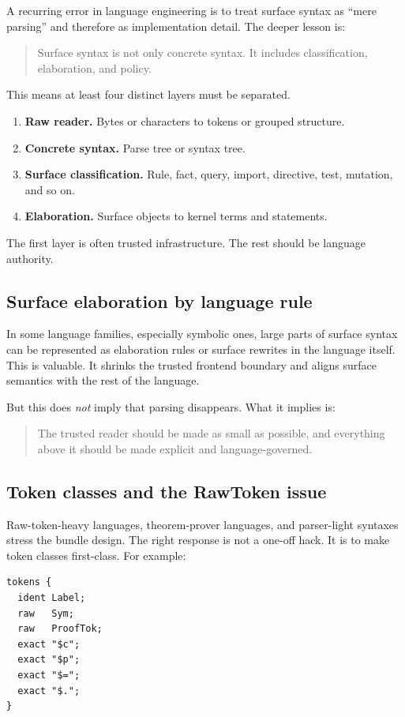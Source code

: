 \documentclass[11pt]{article}
\begin{document}
A recurring error in language engineering is to treat surface syntax as ``mere parsing'' and therefore as implementation detail. The deeper lesson is:
\begin{quote}
Surface syntax is not only concrete syntax. It includes classification, elaboration, and policy.
\end{quote}

This means at least four distinct layers must be separated.
\begin{enumerate}[leftmargin=2em]
  \item \textbf{Raw reader.} Bytes or characters to tokens or grouped structure.
  \item \textbf{Concrete syntax.} Parse tree or syntax tree.
  \item \textbf{Surface classification.} Rule, fact, query, import, directive, test, mutation, and so on.
  \item \textbf{Elaboration.} Surface objects to kernel terms and statements.
\end{enumerate}

The first layer is often trusted infrastructure. The rest should be language authority.

\subsection{Surface elaboration by language rule}

In some language families, especially symbolic ones, large parts of surface syntax can be represented as elaboration rules or surface rewrites in the language itself. This is valuable. It shrinks the trusted frontend boundary and aligns surface semantics with the rest of the language.

But this does \emph{not} imply that parsing disappears. What it implies is:
\begin{quote}
The trusted reader should be made as small as possible, and everything above it should be made explicit and language-governed.
\end{quote}

\subsection{Token classes and the RawToken issue}

Raw-token-heavy languages, theorem-prover languages, and parser-light syntaxes stress the bundle design. The right response is not a one-off hack. It is to make token classes first-class. For example:
\begin{lstlisting}[style=code]
tokens {
  ident Label;
  raw   Sym;
  raw   ProofTok;
  exact "$c";
  exact "$p";
  exact "$=";
  exact "$.";
}
\end{lstlisting}
\end{document}
